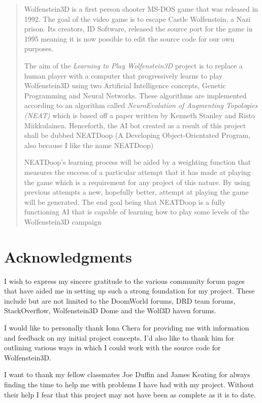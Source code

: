 \documentclass[]{Learning-to-Play-Wolfenstein-thesis}
\begin{document}
\begin{abstract}
Wolfenstein3D is a first person shooter MS-DOS game that was released in 1992. The goal of the video game is to escape Castle Wolfenstein, a Nazi prison. Its creators, ID Software, released the source port for the game in 1995 meaning it is now possible to edit the source code for our own purposes.

The aim of the \textit{Learning to Play Wolfenstein3D} project is to replace a human player with a computer that progressively learns to play Wolfenstein3D using two Artificial Intelligence concepts, Genetic Programming and Neural Networks. These algorithms are implemented according to an algorithm called \textit{NeuroEvolution of Augmenting Topologies (NEAT)} which is based off a paper written by Kenneth Stanley and Risto Miikkulainen. Henceforth, the AI bot created as a result of this project shall be dubbed NEATDoop (A Developing Object-Orientated Program, also because I like the name NEATDoop)

NEATDoop's learning process will be aided by a weighting function that measures the success of a particular attempt that it has made at playing the game which is a requirement for any project of this nature. By using previous attempts a new, hopefully better, attempt at playing the game will be generated. The end goal being that NEATDoop is a fully functioning AI that is capable of learning how to play some levels of the Wolfenstein3D campaign
\end{abstract}
\newpage



\chapter*{Acknowledgments}

I wish to express my sincere gratitude to the various community forum pages that have aided me in setting up such a strong foundation for my project. These include but are not limited to the DoomWorld forums, DRD team forums, StackOverflow, Wolfenstein3D Dome and the Wolf3D haven forums.

I would like to personally thank Iona Chera for providing me with information and feedback on my initial project concepts. I'd also like to thank him for outlining various ways in which I could work with the source code for Wolfenstein3D.

I want to thank my fellow classmates Joe Duffin and James Keating for always finding the time to help me with problems I have had with my project. Without their help I fear that this project may not have been as complete as it is to date.
\end{document}
